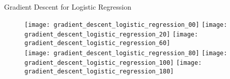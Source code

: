 


\begin{frame}{Gradient Descent for Logistic Regression}
  \begin{figure}
    \texttt{[image: gradient\_descent\_logistic\_regression\_00]}
    \texttt{[image: gradient\_descent\_logistic\_regression\_20]}
    \texttt{[image: gradient\_descent\_logistic\_regression\_60]}\\
    \texttt{[image: gradient\_descent\_logistic\_regression\_80]}
    \texttt{[image: gradient\_descent\_logistic\_regression\_100]}
    \texttt{[image: gradient\_descent\_logistic\_regression\_180]}
  \end{figure}

\end{frame}
